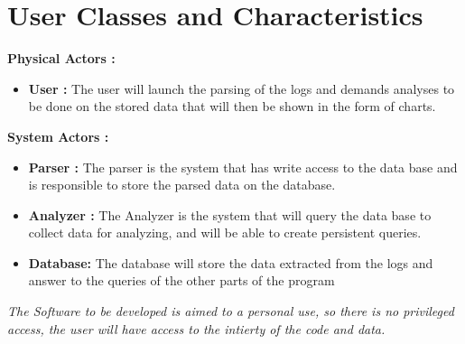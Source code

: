 \documentclass{scrreprt}
\begin{document}
\section{User Classes and Characteristics}

\textbf{Physical Actors :}\\
\begin{itemize}
 \item \textbf{User :} The user will launch the parsing of the logs and demands analyses to be done
   on the stored data that will then be shown in the form of charts.
\end{itemize}
\textbf{System Actors :}\\
\begin{itemize}
 \item \textbf{Parser :} The parser is the system that has write access to the data
   base and is responsible to store the parsed data on the database.
 \item \textbf{Analyzer :} The Analyzer is the system that will query the data
   base to collect data for analyzing, and will be able to create persistent queries.
   \item \textbf{Database: } The database will store the data extracted from the logs and answer to the queries of the other parts of the program
\end{itemize}

\textit{The Software to be developed is aimed to a personal use, so there is no privileged access, the user will have access to the intierty of the code and data.}
\end{document}
